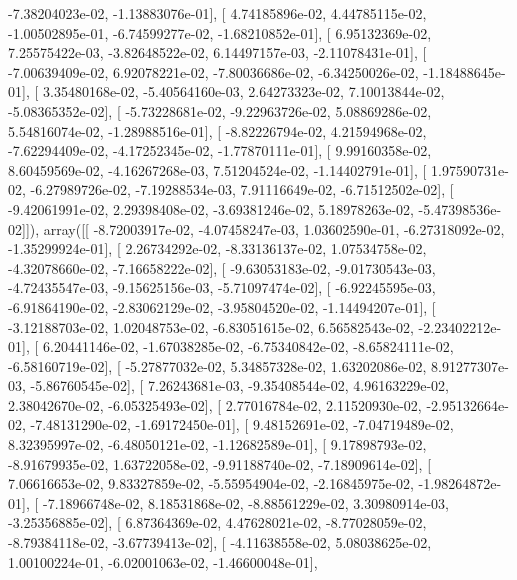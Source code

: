 \documentclass{article}
\begin{document}
         -7.38204023e-02,  -1.13883076e-01],
       [  4.74185896e-02,   4.44785115e-02,  -1.00502895e-01,
         -6.74599277e-02,  -1.68210852e-01],
       [  6.95132369e-02,   7.25575422e-03,  -3.82648522e-02,
          6.14497157e-03,  -2.11078431e-01],
       [ -7.00639409e-02,   6.92078221e-02,  -7.80036686e-02,
         -6.34250026e-02,  -1.18488645e-01],
       [  3.35480168e-02,  -5.40564160e-03,   2.64273323e-02,
          7.10013844e-02,  -5.08365352e-02],
       [ -5.73228681e-02,  -9.22963726e-02,   5.08869286e-02,
          5.54816074e-02,  -1.28988516e-01],
       [ -8.82226794e-02,   4.21594968e-02,  -7.62294409e-02,
         -4.17252345e-02,  -1.77870111e-01],
       [  9.99160358e-02,   8.60459569e-02,  -4.16267268e-03,
          7.51204524e-02,  -1.14402791e-01],
       [  1.97590731e-02,  -6.27989726e-02,  -7.19288534e-03,
          7.91116649e-02,  -6.71512502e-02],
       [ -9.42061991e-02,   2.29398408e-02,  -3.69381246e-02,
          5.18978263e-02,  -5.47398536e-02]]), array([[ -8.72003917e-02,  -4.07458247e-03,   1.03602590e-01,
         -6.27318092e-02,  -1.35299924e-01],
       [  2.26734292e-02,  -8.33136137e-02,   1.07534758e-02,
         -4.32078660e-02,  -7.16658222e-02],
       [ -9.63053183e-02,  -9.01730543e-03,  -4.72435547e-03,
         -9.15625156e-03,  -5.71097474e-02],
       [ -6.92245595e-03,  -6.91864190e-02,  -2.83062129e-02,
         -3.95804520e-02,  -1.14494207e-01],
       [ -3.12188703e-02,   1.02048753e-02,  -6.83051615e-02,
          6.56582543e-02,  -2.23402212e-01],
       [  6.20441146e-02,  -1.67038285e-02,  -6.75340842e-02,
         -8.65824111e-02,  -6.58160719e-02],
       [ -5.27877032e-02,   5.34857328e-02,   1.63202086e-02,
          8.91277307e-03,  -5.86760545e-02],
       [  7.26243681e-03,  -9.35408544e-02,   4.96163229e-02,
          2.38042670e-02,  -6.05325493e-02],
       [  2.77016784e-02,   2.11520930e-02,  -2.95132664e-02,
         -7.48131290e-02,  -1.69172450e-01],
       [  9.48152691e-02,  -7.04719489e-02,   8.32395997e-02,
         -6.48050121e-02,  -1.12682589e-01],
       [  9.17898793e-02,  -8.91679935e-02,   1.63722058e-02,
         -9.91188740e-02,  -7.18909614e-02],
       [  7.06616653e-02,   9.83327859e-02,  -5.55954904e-02,
         -2.16845975e-02,  -1.98264872e-01],
       [ -7.18966748e-02,   8.18531868e-02,  -8.88561229e-02,
          3.30980914e-03,  -3.25356885e-02],
       [  6.87364369e-02,   4.47628021e-02,  -8.77028059e-02,
         -8.79384118e-02,  -3.67739413e-02],
       [ -4.11638558e-02,   5.08038625e-02,   1.00100224e-01,
         -6.02001063e-02,  -1.46600048e-01],
\end{document}
